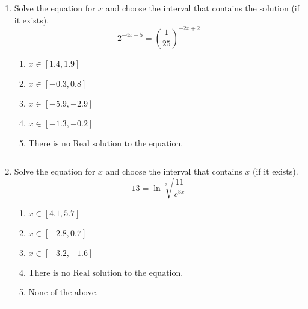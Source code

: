 \documentclass[14pt]{extbook}
\newcommand{\litem}[1]{\item#1\hspace*{-1cm}\rule{\textwidth}{0.4pt}}
\begin{document}
\begin{enumerate}
{\begin{enumerate}[label=\Alph*.]
\end{enumerate} }
\litem{
Solve the equation for $x$ and choose the interval that contains the solution (if it exists).\[ 2^{-4x-5} = \left(\frac{1}{25}\right)^{-2x+2} \]\begin{enumerate}[label=\Alph*.]
\item \( x \in [1.4, 1.9] \)
\item \( x \in [-0.3, 0.8] \)
\item \( x \in [-5.9, -2.9] \)
\item \( x \in [-1.3, -0.2] \)
\item \( \text{There is no Real solution to the equation.} \)

\end{enumerate} }
\litem{
 Solve the equation for $x$ and choose the interval that contains $x$ (if it exists).\[  13 = \ln{\sqrt[3]{\frac{11}{e^{8x}}}} \]\begin{enumerate}[label=\Alph*.]
\item \( x \in [4.1, 5.7] \)
\item \( x \in [-2.8, 0.7] \)
\item \( x \in [-3.2, -1.6] \)
\item \( \text{There is no Real solution to the equation.} \)
\item \( \text{None of the above.} \)

\end{enumerate} }
\end{enumerate}
\end{document}
